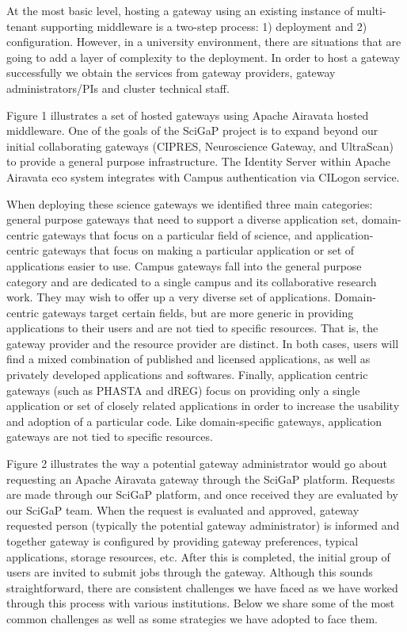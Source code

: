 \documentclass[sigconf]{acmart}
\begin{document}
At the most basic level, hosting a gateway using an existing instance of multi-tenant supporting middleware is a two-step process: 1) deployment and 2) configuration.  However, in a university environment, there are situations that are going to add a layer of complexity to the deployment. In order to host a gateway successfully we obtain the services from gateway providers, gateway administrators/PIs and cluster technical staff.

Figure 1 illustrates a set of hosted gateways using Apache Airavata hosted middleware. One of the goals of the SciGaP project is to expand beyond our initial collaborating gateways (CIPRES, Neuroscience Gateway, and UltraScan) to provide a general purpose infrastructure.  The Identity Server \cite{nakandala2016apache} within Apache Airavata eco system integrates with Campus authentication via CILogon \cite{basney2014cilogon} service.

When deploying these science gateways we identified three main categories:  general purpose gateways that need to support a diverse application set, domain-centric gateways that focus on a particular field of science, and application-centric gateways that focus on making a particular application or set of applications easier to use. Campus gateways fall into the general purpose category and are dedicated to a single campus and its collaborative research work. They may wish to offer up a very diverse set of applications.  Domain-centric gateways target  certain fields, but are more generic in providing applications to their users and are not tied to specific resources. That is, the gateway provider and the resource provider are distinct. In both cases, users will find a mixed combination of published and licensed applications, as well as privately developed applications and softwares. Finally, application centric gateways (such as PHASTA and dREG) focus on providing only a single application or set of closely related applications in order to increase the usability and adoption of a particular code. Like domain-specific gateways, application gateways are not tied to specific resources.

Figure 2 illustrates the way a potential gateway administrator would go about requesting an Apache Airavata gateway through the SciGaP platform.  Requests are made through our SciGaP platform, and once received they are evaluated by our SciGaP team.  When the request is evaluated and  approved, gateway requested person  (typically the potential gateway administrator) is informed and together gateway is configured by providing gateway preferences, typical applications, storage resources, etc.  After this is completed, the initial group of users are invited to submit jobs through the gateway.  Although this sounds straightforward, there are consistent challenges we have faced as we have worked through this process with various institutions.  Below we share some of the most common challenges as well as some strategies we have adopted to face them.
\end{document}
